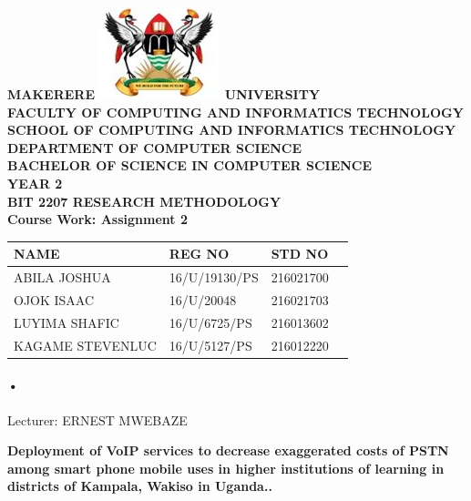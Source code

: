 \documentclass[12pt]{article}
\begin{document}
\begin{Huge}
\begin{center}
\begin{normalsize}
\textbf{MAKERERE \includegraphics[scale=0.5]{logo} UNIVERSITY }\\


\textbf{FACULTY OF COMPUTING AND INFORMATICS TECHNOLOGY} \\
\textbf{SCHOOL OF COMPUTING AND INFORMATICS TECHNOLOGY} \\
\textbf{DEPARTMENT OF COMPUTER SCIENCE} \\
\textbf{BACHELOR OF SCIENCE IN COMPUTER SCIENCE} \\
\textbf{YEAR 2} \\
\textbf{BIT 2207 RESEARCH METHODOLOGY} \\
\textbf{Course Work: Assignment 2}\\
\end{normalsize}
\end{center}
\end{Huge}

\begin{center}
\begin{tabular}{|l|l|l|c|}
\hline NAME  & REG NO & STD NO \\\hline
ABILA JOSHUA& 16/U/19130/PS & 216021700 \\\hline
OJOK ISAAC& 16/U/20048& 216021703 \\\hline
LUYIMA SHAFIC& 16/U/6725/PS	 & 216013602 \\\hline
KAGAME STEVENLUC&16/U/5127/PS  & 216012220\\\hline

\end{tabular}

\paragraph{•}
Lecturer: ERNEST MWEBAZE \\


\end{center}

\newpage

\begin{center}
\textbf{\sc Deployment of VoIP services to decrease exaggerated costs of PSTN among smart phone mobile uses in higher institutions of learning in districts of Kampala, Wakiso in Uganda..}\\
\end{center}
\end{document}
